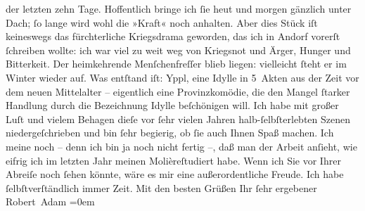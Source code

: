 \begin{ledgroupsized}[t]{13cm}
               der letzten zehn Tage. Hoffentlich bringe ich ſie heut und morgen gänzlich unter
               Dach; ſo lange wird wohl die {\pb}»Kraft« noch
               anhalten. Aber dies Stück iſt keineswegs das fürchterliche Kriegsdrama geworden, das ich in Andorf vorerſt ſchreiben wollte: ich war viel zu
               weit weg von Kriegsnot und Ärger, Hunger und Bitterkeit. Der heimkehrende
               Menſchenfreſſer blieb liegen: vielleicht ſteht er im Winter wieder auf. Was entſtand
               iſt: Yppl, eine Idylle in 5 Akten aus der Zeit
               vor dem neuen Mittelalter – eigentlich eine Provinzkomödie, die den Mangel ſtarker
               Handlung durch die Bezeichnung Idylle beſchönigen will. Ich habe mit großer Luſt und
               vielem Behagen dieſe vor ſehr vielen Jahren halb-ſelbſterlebten Szenen
               niedergeſchrieben und bin ſehr begierig, ob ſie auch Ihnen Spaß machen. Ich meine
               noch – denn ich bin ja noch nicht fertig –, daß man der Arbeit anſieht, wie eifrig
               ich im letzten Jahr meinen Molièreſtudiert habe.\pend
           \pstart
           {\pb}Wenn ich Sie vor Ihrer Abreiſe noch ſehen
               könnte, wäre es mir \introOben{}eine\introOben{} außerordentliche Freude. Ich habe
               ſelbſtverſtändlich immer Zeit.\pend
           \pstart
           Mit den besten Grüßen Ihr ſehr ergebener{\\[\baselineskip]}\spacefill\mbox{Robert Adam}\pend
           \leftskip=0em{}
         
         \endnumbering{}\end{ledgroupsized}  \newcommand{\dateiname}{L02291}\newcommand{\titel}{Robert Adam an Arthur Schnitzler, 29. 7. 1918}\newcommand{\editorInnen}{Martin Anton Müller und Gerd-Hermann Susen}
      